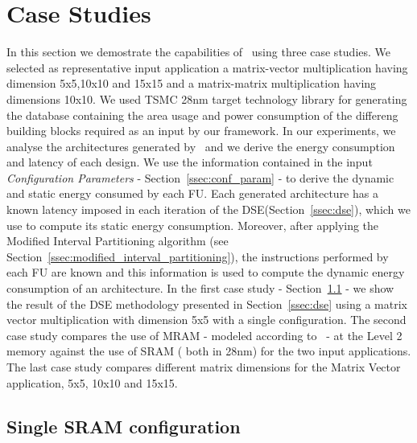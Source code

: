 \section{Case Studies}
In this section we demostrate the capabilities of \frameworkname~using three case studies. We selected as representative input application a matrix-vector multiplication having dimension 5x5,10x10 and 15x15 and a matrix-matrix multiplication having dimensions 10x10. We used TSMC 28nm target technology library for generating the database containing the area usage and power consumption of the differeng building blocks required as an input by our framework.
In our experiments, we analyse the architectures generated by \frameworkname~and we derive the energy consumption and latency of each design. We use the information contained in the input \textit{Configuration Parameters} - Section~\ref{ssec:conf_param} - to derive the dynamic and static energy consumed by each FU. Each generated architecture has a known latency imposed in each iteration of the DSE(Section~\ref{ssec:dse}), which we use to compute its static energy consumption. Moreover, after applying the Modified Interval Partitioning algorithm (see Section~\ref{ssec:modified_interval_partitioning}), the instructions performed by each FU are known and this information is used to compute the dynamic energy consumption of an architecture.
In the first case study - Section~\ref{ssec:exp_single} - we show the result of the DSE methodology presented in Section~\ref{ssec:dse} using a matrix vector multiplication with dimension 5x5 with a single configuration. The second case study compares the use of MRAM - modeled according to~\cite{8310393} - at the Level 2 memory against the use of SRAM ( both in 28nm) for the two input applications. The last case study compares different matrix dimensions for the Matrix Vector application, 5x5, 10x10 and 15x15.


\subsection{Single SRAM configuration}
\label{ssec:exp_single}

